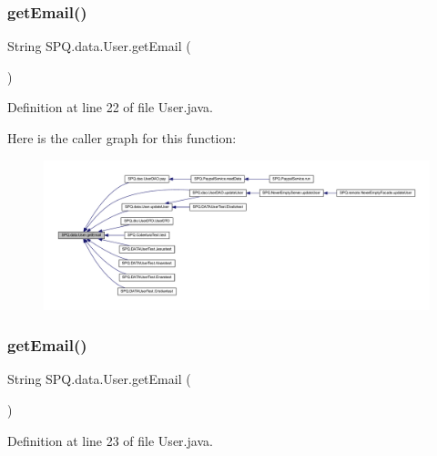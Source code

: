 \subsubsection{\texorpdfstring{get\+Email()}{getEmail()}\hspace{0.1cm}{\footnotesize\ttfamily [2/4]}}
{\footnotesize\ttfamily String S\+P\+Q.\+data.\+User.\+get\+Email (\begin{DoxyParamCaption}{ }\end{DoxyParamCaption})}



Definition at line 22 of file User.\+java.

Here is the caller graph for this function\+:\nopagebreak
\begin{figure}[H]
\begin{center}
\leavevmode
\includegraphics[width=350pt]{class_s_p_q_1_1data_1_1_user_a4f3ae0062ee7529314a5b791707ff4b4_icgraph}
\end{center}
\end{figure}
\mbox{\label{class_s_p_q_1_1data_1_1_user_a4f3ae0062ee7529314a5b791707ff4b4}} 
\subsubsection{\texorpdfstring{get\+Email()}{getEmail()}\hspace{0.1cm}{\footnotesize\ttfamily [3/4]}}
{\footnotesize\ttfamily String S\+P\+Q.\+data.\+User.\+get\+Email (\begin{DoxyParamCaption}{ }\end{DoxyParamCaption})}



Definition at line 23 of file User.\+java.

\mbox{\label{class_s_p_q_1_1data_1_1_user_a4f3ae0062ee7529314a5b791707ff4b4}} 
